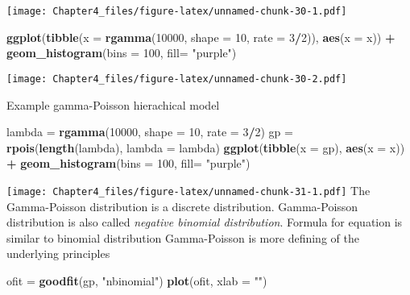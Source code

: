 \documentclass[]{article}
\newenvironment{Shaded}{\begin{snugshade}}{\end{snugshade}}
\newcommand{\DataTypeTok}[1]{\textcolor[rgb]{0.13,0.29,0.53}{#1}}
\newcommand{\DecValTok}[1]{\textcolor[rgb]{0.00,0.00,0.81}{#1}}
\newcommand{\KeywordTok}[1]{\textcolor[rgb]{0.13,0.29,0.53}{\textbf{#1}}}
\newcommand{\NormalTok}[1]{#1}
\newcommand{\OperatorTok}[1]{\textcolor[rgb]{0.81,0.36,0.00}{\textbf{#1}}}
\newcommand{\StringTok}[1]{\textcolor[rgb]{0.31,0.60,0.02}{#1}}
\begin{document}
\texttt{[image: Chapter4\_files/figure-latex/unnamed-chunk-30-1.pdf]}

\begin{Shaded}
\begin{Highlighting}[]
\KeywordTok{ggplot}\NormalTok{(}\KeywordTok{tibble}\NormalTok{(}\DataTypeTok{x =} \KeywordTok{rgamma}\NormalTok{(}\DecValTok{10000}\NormalTok{, }\DataTypeTok{shape =} \DecValTok{10}\NormalTok{, }\DataTypeTok{rate =} \DecValTok{3}\OperatorTok{/}\DecValTok{2}\NormalTok{)),}
   \KeywordTok{aes}\NormalTok{(}\DataTypeTok{x =}\NormalTok{ x)) }\OperatorTok{+}\StringTok{ }\KeywordTok{geom_histogram}\NormalTok{(}\DataTypeTok{bins =} \DecValTok{100}\NormalTok{, }\DataTypeTok{fill=} \StringTok{"purple"}\NormalTok{)}
\end{Highlighting}
\end{Shaded}

\texttt{[image: Chapter4\_files/figure-latex/unnamed-chunk-30-2.pdf]}

Example gamma-Poisson hierachical model

\begin{Shaded}
\begin{Highlighting}[]
\NormalTok{lambda =}\StringTok{ }\KeywordTok{rgamma}\NormalTok{(}\DecValTok{10000}\NormalTok{, }\DataTypeTok{shape =} \DecValTok{10}\NormalTok{, }\DataTypeTok{rate =} \DecValTok{3}\OperatorTok{/}\DecValTok{2}\NormalTok{)}
\NormalTok{gp =}\StringTok{ }\KeywordTok{rpois}\NormalTok{(}\KeywordTok{length}\NormalTok{(lambda), }\DataTypeTok{lambda =}\NormalTok{ lambda)}
\KeywordTok{ggplot}\NormalTok{(}\KeywordTok{tibble}\NormalTok{(}\DataTypeTok{x =}\NormalTok{ gp), }\KeywordTok{aes}\NormalTok{(}\DataTypeTok{x =}\NormalTok{ x)) }\OperatorTok{+}
\StringTok{  }\KeywordTok{geom_histogram}\NormalTok{(}\DataTypeTok{bins =} \DecValTok{100}\NormalTok{, }\DataTypeTok{fill=} \StringTok{"purple"}\NormalTok{)}
\end{Highlighting}
\end{Shaded}

\texttt{[image: Chapter4\_files/figure-latex/unnamed-chunk-31-1.pdf]} The
Gamma-Poisson distribution is a discrete distribution. Gamma-Poisson
distribution is also called \emph{negative binomial distribution}.
Formula for equation is similar to binomial distribution Gamma-Poisson
is more defining of the underlying principles

\begin{Shaded}
\begin{Highlighting}[]
\NormalTok{ofit =}\StringTok{ }\KeywordTok{goodfit}\NormalTok{(gp, }\StringTok{"nbinomial"}\NormalTok{)}
\KeywordTok{plot}\NormalTok{(ofit, }\DataTypeTok{xlab =} \StringTok{""}\NormalTok{)}
\end{Highlighting}
\end{Shaded}
\end{document}
